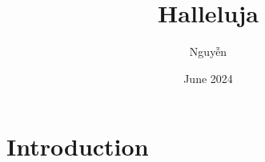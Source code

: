 \documentclass{article}
\title{Halleluja}
\author{Nguyễn}
\date{June 2024}
\begin{document}
        
\maketitle
        
\section{Introduction}
        
\end{document}
